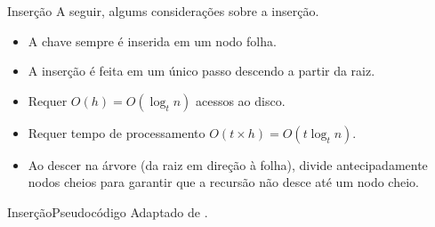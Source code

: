 \documentclass[aspectratio=169]{beamer}
\begin{document}
{%

\begin{frame}{Inserção}
A seguir, algums considerações sobre a inserção.
\begin{itemize}
 \item A chave sempre é inserida em um nodo folha.
 \item A inserção é feita em um único passo descendo a partir da raiz.
 \item Requer $O(h) = O(\log_t n)$ acessos ao disco.
 \item Requer tempo de processamento $O(t \times h) = O(t \log_t n)$. 
 \item Ao descer na árvore (da raiz em direção à folha), divide antecipadamente nodos cheios para garantir que a recursão não desce até um nodo cheio.
\end{itemize}
\end{frame}


\begin{frame}{Inserção}{Pseudocódigo}
\tiny{Adaptado de \cite{Cormen2012}.}
\end{frame}


}
\end{document}
